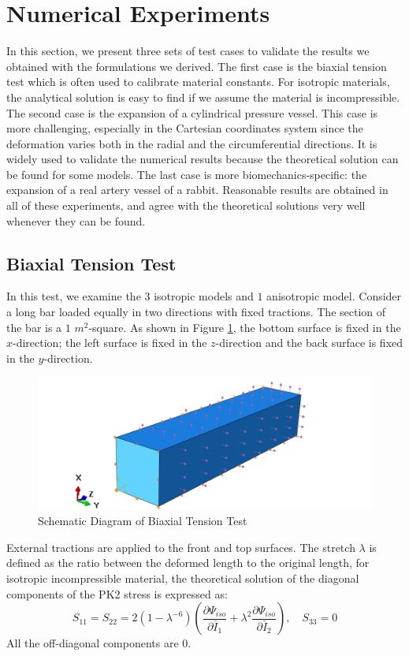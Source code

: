 \section{Numerical Experiments}
In this section, we present three sets of test cases to validate the results we obtained with the formulations we derived. The first case is the biaxial tension test which is often used to calibrate material constants. For isotropic materials, the analytical solution is easy to find if we assume the material is incompressible. The second case is the expansion of a cylindrical pressure vessel. This case is more challenging, especially in the Cartesian coordinates system since the deformation varies both in the radial and the circumferential directions. It is widely used to validate the numerical results because the theoretical solution can be found for some models. The last case is more biomechanics-specific: the expansion of a real artery vessel of a rabbit. Reasonable results are obtained in all of these experiments, and agree with the theoretical solutions very well whenever they can be found.

\subsection{Biaxial Tension Test}
\label{biaxial_tension_test}
In this test, we examine the $3$ isotropic models and $1$ anisotropic model. Consider a long bar loaded equally in two directions with fixed tractions. The section of the bar is a $1$ $m^2$-square. As shown in Figure \ref{fig:biaxial_schematic}, the bottom surface is fixed in the $x$-direction; the left surface is fixed in the $z$-direction and the back surface is fixed in the $y$-direction. 

\begin{figure}[H]
\centering
\includegraphics[width=.8\textwidth]{./figures/biaxial_schematic2.png}
\caption{Schematic Diagram of Biaxial Tension Test}
\label{fig:biaxial_schematic}
\end{figure}

External tractions are applied to the front and top surfaces. The stretch $\lambda$ is defined as the ratio between the deformed length to the original length, for isotropic incompressible material, the theoretical solution of the diagonal components of the PK2 stress is expressed as:
\begin{equation} \label{biaxialPK2}
S_{11} = S_{22} = 2(1 - {\lambda}^{-6})(\frac{\partial\Psi_{iso}}{\partial\bar{I}_1} + {\lambda}^2\frac{\partial\Psi_{iso}}{\partial\bar{I}_2}), \quad S_{33} = 0
\end{equation}
All the off-diagonal components are $0$.

